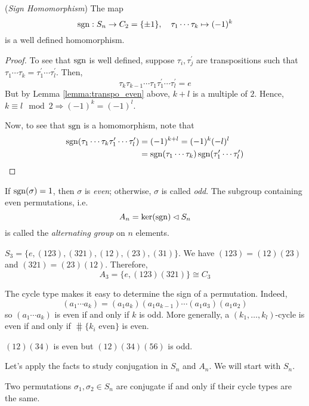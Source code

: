 \documentclass[10pt, a4paper, twoside]{report}
\begin{document}
\begin{theorem}
    (\emph{Sign Homomorphism}) The map \[\operatorname{sgn}:S_n\to C_2=\{\pm 1\},\quad\tau_1\cdots\tau_k\mapsto (-1)^k\] is a well defined homomorphism.
\end{theorem}
\begin{proof}
    To see that \(\operatorname{sgn}\) is well defined, suppose \(\tau_i,\tau_j^\prime\) are transpositions such that \(\tau_1\cdots\tau_k=\tau_1^\prime\cdots\tau_l^\prime\). Then,
    \[\tau_k\tau_{k-1}\cdots\tau_1\tau_1^\prime\cdots\tau_l^\prime=e\]
    But by Lemma \ref{lemma:transpo_even} above, \(k+l\) is a multiple of \(2\). Hence, \(k\equiv l\mod 2\Rightarrow (-1)^k=(-1)^l\).

    Now, to see that \(\operatorname{sgn}\) is a homomorphism, note that 
    \begin{align*}
        \operatorname{sgn}(\tau_1\cdots\tau_k\tau_1^\prime\cdots\tau_l^\prime)&=(-1)^{k+l}=(-1)^k(-l)^l \\
        &=\operatorname{sgn}(\tau_1\cdots\tau_k)\operatorname{sgn}(\tau_1^\prime\cdots\tau_l^\prime)
    \end{align*}
\end{proof}
\begin{definition}
    If \(\operatorname{sgn}(\sigma)=1\), then \(\sigma\) is \emph{even}; otherwise, \(\sigma\) is called \emph{odd}. The subgroup containing even permutations, i.e. 
    \[A_n=\ker(\operatorname{sgn})\lhd S_n\]
    is called the \emph{alternating group} on \(n\) elements.
\end{definition}
\begin{example}
    \(S_3=\{e,(123),(321),(12),(23),(31)\}\). We have \((123)=(12)(23)\) and \((321)=(23)(12)\). Therefore,
    \[A_3=\{e,(123)(321)\}\cong C_3\]
\end{example}
\begin{remark}
    The cycle type makes it easy to determine the sign of a permutation. Indeed, 
    \[(a_1\cdots a_k)=(a_1a_k)(a_1a_{k-1})\cdots(a_1a_3)(a_1a_2)\]
    so \((a_1\cdots a_k)\) is even if and only if \(k\) is odd. More generally, a \((k_1,\ldots,k_l)\)-cycle is even if and only if \(\hash\{k_i\text{  even}\}\) is even.
\end{remark}
\begin{example}
    \((12)(34)\) is even but \((12)(34)(56)\) is odd.
\end{example}
Let's apply the facts to study conjugation in \(S_n\) and \(A_n\). We will start with \(S_n\).
\begin{theorem}
    Two permutations \(\sigma_1,\sigma_2\in S_n\) are conjugate if and only if their cycle types are the same.
    \label{thm:permu_conj}
\end{theorem}
\end{document}
